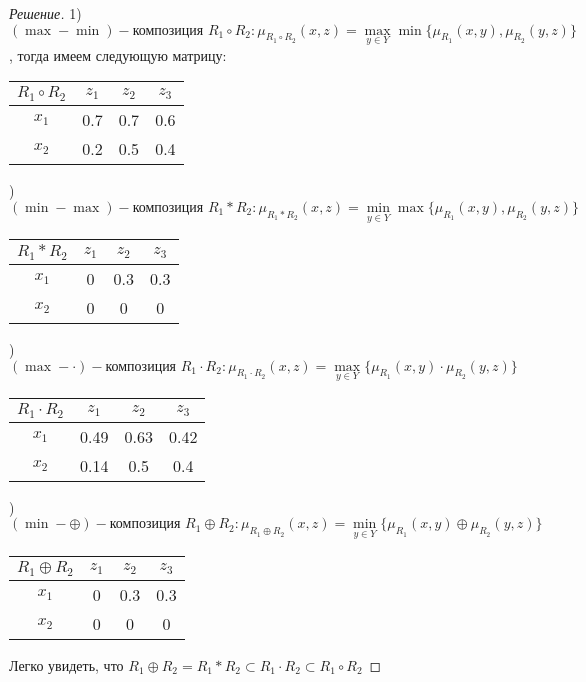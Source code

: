 \documentclass[11pt,a4paper,oneside]{article}
\newenvironment{solution}{
	\begin{proof}[Решение]
		\vspace{-8px}
		\setlength{\parskip}{4px}
		\setlength{\parindent}{0px}
	}{
	\end{proof}
}
\begin{document}
	\begin{solution}
		1) $(\max-\min)-\text{композиция } R_1 \circ R_2: \mu_{R_1 \circ R_2}(x,z) = \max\limits_{y \in Y} \min\{ \mu_{R_1}(x,y) , \mu_{R_2}(y,z) \}$, тогда имеем следующую матрицу:
		\begin{table}[!hbtp]
			\begin{tabular}{|c|c|c|c|}
				\hline
				$R_1 \circ R_2$ & $z_1$ & $z_2$ & $z_3$ \\ \hline
				$x_1$ & 0.7     & 0.7     & 0.6     \\ \hline
				$x_2$ & 0.2     & 0.5   & 0.4   \\ \hline
			\end{tabular}
		\end{table}
		) $(\min-\max)-\text{композиция } R_1 \ast R_2: \mu_{R_1 \ast R_2}(x,z) = \min\limits_{y \in Y} \max\{ \mu_{R_1}(x,y) , \mu_{R_2}(y,z) \}$
		\begin{table}[!hbtp]
			\begin{tabular}{|c|c|c|c|}
				\hline
				$R_1 \ast R_2$ & $z_1$ & $z_2$ & $z_3$ \\ \hline
				$x_1$ & 0     & 0.3     & 0.3     \\ \hline
				$x_2$ & 0     & 0   & 0   \\ \hline
			\end{tabular}
		\end{table}
		) $(\max-\cdot)-\text{композиция } R_1 \cdot R_2: \mu_{R_1 \cdot R_2}(x,z) = \max\limits_{y \in Y} \{ \mu_{R_1}(x,y) \cdot \mu_{R_2}(y,z) \}$
		\begin{table}[!hbtp]
			\begin{tabular}{|c|c|c|c|}
				\hline
				$R_1 \cdot R_2$ & $z_1$ & $z_2$ & $z_3$ \\ \hline
				$x_1$ & 0.49  & 0.63& 0.42     \\ \hline
				$x_2$ & 0.14     & 0.5   & 0.4   \\ \hline
			\end{tabular}
		\end{table}
		) $(\min-\oplus)-\text{композиция } R_1 \oplus R_2: \mu_{R_1 \oplus R_2}(x,z) = \min\limits_{y \in Y} \{ \mu_{R_1}(x,y) \oplus \mu_{R_2}(y,z) \}$
		\begin{table}[!hbtp]
			\begin{tabular}{|c|c|c|c|}
				\hline
				$R_1 \oplus R_2$ & $z_1$ & $z_2$ & $z_3$ \\ \hline
				$x_1$ & 0     & 0.3     & 0.3     \\ \hline
				$x_2$ & 0     & 0   & 0   \\ \hline
			\end{tabular}
		\end{table}
		\newline
		Легко увидеть, что $ R_1 \oplus R_2 = R_1 \ast R_2 \subset  R_1 \cdot R_2 \subset R_1 \circ R_2 $
	\end{solution}
\end{document}
